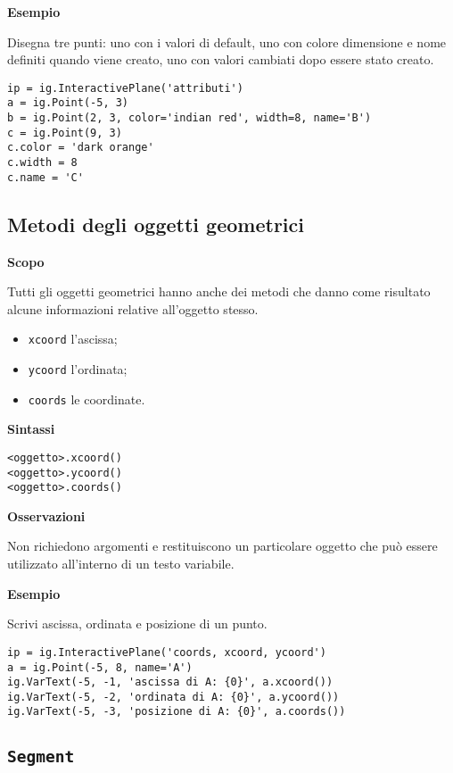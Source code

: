\textbf{Esempio}

Disegna tre punti: uno con i valori di default,
uno con colore dimensione e nome definiti quando viene creato,
uno con valori cambiati dopo essere stato creato.

\begin{lstlisting}
ip = ig.InteractivePlane('attributi')
a = ig.Point(-5, 3)
b = ig.Point(2, 3, color='indian red', width=8, name='B')
c = ig.Point(9, 3)
c.color = 'dark orange'
c.width = 8
c.name = 'C'
\end{lstlisting}


\subsection{Metodi degli oggetti geometrici}
\label{sub:geoint_metodi}

\textbf{Scopo}

Tutti gli oggetti geometrici hanno anche dei metodi che danno come risultato
alcune informazioni relative all'oggetto stesso.
\begin{itemize} [noitemsep]
\item \texttt{xcoord} l'ascissa;
\item \texttt{ycoord} l'ordinata;
\item \texttt{coords} le coordinate.
\end{itemize}

\textbf{Sintassi}

\begin{lstlisting}
<oggetto>.xcoord()
<oggetto>.ycoord()
<oggetto>.coords()
\end{lstlisting}

\textbf{Osservazioni}

Non richiedono argomenti e restituiscono un particolare oggetto che può essere
utilizzato all'interno di un testo variabile.

\textbf{Esempio}

Scrivi ascissa, ordinata e posizione di un punto.

\begin{lstlisting}
ip = ig.InteractivePlane('coords, xcoord, ycoord')
a = ig.Point(-5, 8, name='A')
ig.VarText(-5, -1, 'ascissa di A: {0}', a.xcoord())
ig.VarText(-5, -2, 'ordinata di A: {0}', a.ycoord())
ig.VarText(-5, -3, 'posizione di A: {0}', a.coords())
\end{lstlisting}


\subsection{\texttt{Segment}}
\label{sub:geoint_segment}

